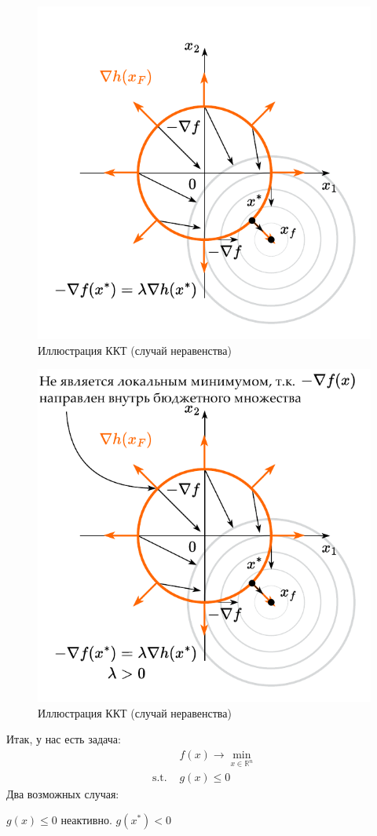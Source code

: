 \documentclass[
  russian,
  letterpaper,
  DIV=11,
  numbers=noendperiod]{scrartcl}
\begin{document}
\begin{figure}[H]

{\centering \includegraphics[width=0.5\linewidth,height=\textheight,keepaspectratio]{ineq_constr_10.pdf}

}

\caption{Иллюстрация ККТ (случай неравенства)}

\end{figure}%

\begin{figure}[H]

{\centering \includegraphics[width=0.5\linewidth,height=\textheight,keepaspectratio]{ineq_constr_11_ru.pdf}

}

\caption{Иллюстрация ККТ (случай неравенства)}

\end{figure}%

Итак, у нас есть задача: \[
\begin{split}
& f(x) \to \min\limits_{x \in \mathbb{R}^n} \\
\text{s.t. } & g(x) \leq 0
\end{split}
\] Два возможных случая:

\(g(x) \leq 0\) неактивно. \(g(x^*) < 0\)
\end{document}
